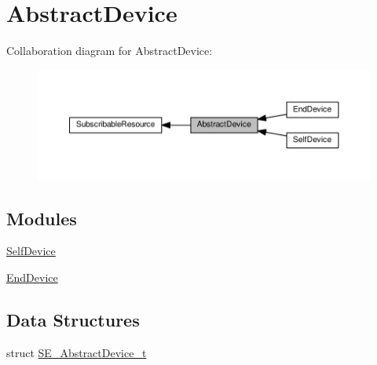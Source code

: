 \hypertarget{group__AbstractDevice}{}\section{Abstract\+Device}
\label{group__AbstractDevice}
Collaboration diagram for Abstract\+Device\+:\nopagebreak
\begin{figure}[H]
\begin{center}
\leavevmode
\includegraphics[width=350pt]{group__AbstractDevice}
\end{center}
\end{figure}
\subsection*{Modules}
\begin{DoxyCompactItemize}
\item 
\hyperlink{group__SelfDevice}{Self\+Device}
\item 
\hyperlink{group__EndDevice}{End\+Device}
\end{DoxyCompactItemize}
\subsection*{Data Structures}
\begin{DoxyCompactItemize}
\item 
struct \hyperlink{structSE__AbstractDevice__t}{S\+E\+\_\+\+Abstract\+Device\+\_\+t}
\end{DoxyCompactItemize}
